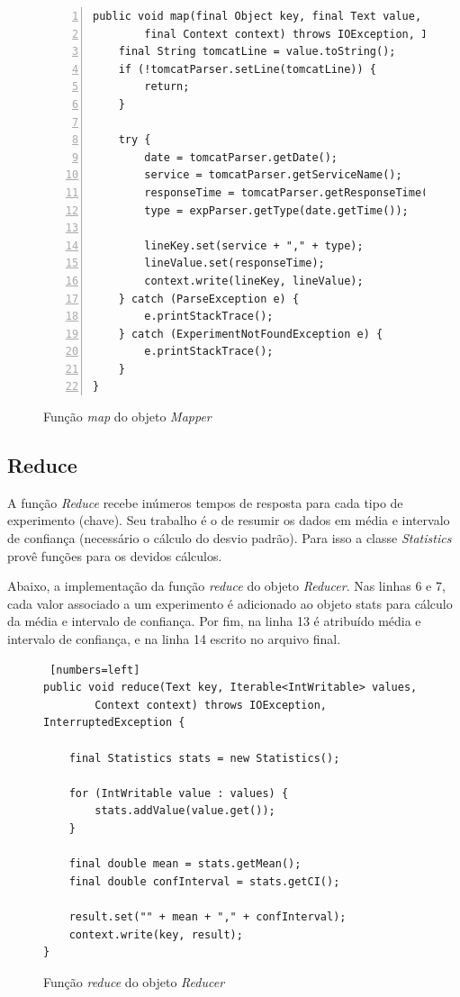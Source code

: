 \documentclass[brazil, a4paper,12pt]{article}
\begin{document}
\begin{figure} [!htb]
\begin{center}
\footnotesize
\begin{lstlisting}[numbers=left]
public void map(final Object key, final Text value,
		final Context context) throws IOException, InterruptedException {
	final String tomcatLine = value.toString();
	if (!tomcatParser.setLine(tomcatLine)) {
		return;
	}

	try {
		date = tomcatParser.getDate();
		service = tomcatParser.getServiceName();
		responseTime = tomcatParser.getResponseTime();
		type = expParser.getType(date.getTime());

		lineKey.set(service + "," + type);
		lineValue.set(responseTime);
		context.write(lineKey, lineValue);
	} catch (ParseException e) {
		e.printStackTrace();
	} catch (ExperimentNotFoundException e) {
		e.printStackTrace();
	}
}
\end{lstlisting}
\end{center}
\caption{Função \emph{map} do objeto \emph{Mapper}}
\end{figure}


\subsection{Reduce}
A função \emph{Reduce} recebe inúmeros tempos de resposta para cada tipo de experimento (chave). Seu trabalho é o de resumir os dados em média e intervalo de confiança (necessário o cálculo do desvio padrão). Para isso a classe \emph{Statistics} provê funções para os devidos cálculos.

Abaixo, a implementação da função \emph{reduce} do objeto \emph{Reducer}. Nas linhas 6 e 7, cada valor associado a um experimento é adicionado ao objeto stats para cálculo da média e intervalo de confiança. Por fim, na linha 13 é atribuído média e intervalo de confiança, e na linha 14 escrito no arquivo final.

\begin{figure} [!htb]
\begin{center}
\footnotesize
\begin{lstlisting} [numbers=left]
public void reduce(Text key, Iterable<IntWritable> values,
		Context context) throws IOException, InterruptedException {

	final Statistics stats = new Statistics();

	for (IntWritable value : values) {
		stats.addValue(value.get());
	}

	final double mean = stats.getMean();
	final double confInterval = stats.getCI();

	result.set("" + mean + "," + confInterval);
	context.write(key, result);
}
\end{lstlisting}
\end{center}
\caption{Função \emph{reduce} do objeto \emph{Reducer}}
\end{figure}
\end{document}
